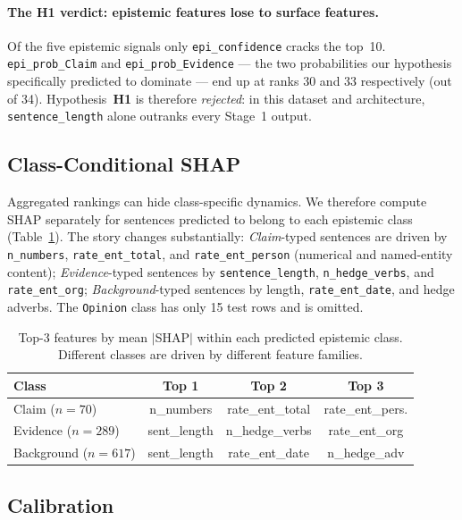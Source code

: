 \documentclass[conference]{IEEEtran}
\begin{document}
\paragraph{The H1 verdict: epistemic features lose to surface features.}
Of the five epistemic signals only \texttt{epi\_confidence} cracks the
top~10. \texttt{epi\_prob\_Claim} and \texttt{epi\_prob\_Evidence} ---
the two probabilities our hypothesis specifically predicted to dominate ---
end up at ranks 30 and 33 respectively (out of 34). Hypothesis~\textbf{H1}
is therefore \emph{rejected}: in this dataset and architecture,
\texttt{sentence\_length} alone outranks every Stage~1 output.

\subsection{Class-Conditional SHAP}

Aggregated rankings can hide class-specific dynamics. We therefore compute
SHAP separately for sentences predicted to belong to each epistemic
class (Table~\ref{tab:cc}). The story changes substantially:
\textit{Claim}-typed sentences are driven by \texttt{n\_numbers},
\texttt{rate\_ent\_total}, and \texttt{rate\_ent\_person} (numerical and
named-entity content); \textit{Evidence}-typed sentences by
\texttt{sentence\_length}, \texttt{n\_hedge\_verbs}, and
\texttt{rate\_ent\_org}; \textit{Background}-typed sentences by
length, \texttt{rate\_ent\_date}, and hedge adverbs. The
\texttt{Opinion} class has only 15 test rows and is omitted.

\begin{table}[t]
\centering
\caption{Top-3 features by mean $|$SHAP$|$ within each predicted
epistemic class. Different classes are driven by different feature
families.}
\label{tab:cc}
\small
\setlength{\tabcolsep}{3pt}
\begin{tabular}{lccc}
\toprule
\textbf{Class} & \textbf{Top 1} & \textbf{Top 2} & \textbf{Top 3} \\
\midrule
Claim ($n{=}70$)       & n\_numbers       & rate\_ent\_total & rate\_ent\_pers. \\
Evidence ($n{=}289$)   & sent\_length     & n\_hedge\_verbs  & rate\_ent\_org \\
Background ($n{=}617$) & sent\_length     & rate\_ent\_date  & n\_hedge\_adv \\
\bottomrule
\end{tabular}
\end{table}

\subsection{Calibration}
\end{document}
